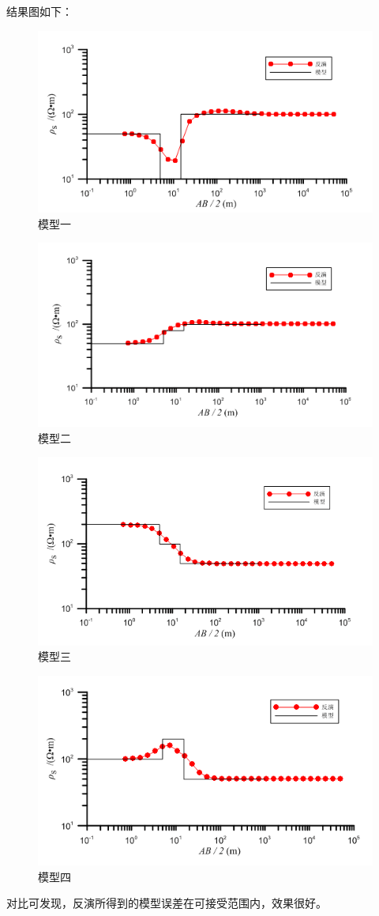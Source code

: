 \documentclass[hyperref,UTF-8,twoside]{ctexart}
\numberwithin{equation}{section}
\begin{document}
结果图如下：

\begin{figure}[ht]
\centering
\includegraphics[scale=0.5]{1.png}
\caption{模型一}
\end{figure}
\begin{figure}[ht]
\centering
\includegraphics[scale=0.5]{2.png}
\caption{模型二}
\end{figure}
\begin{figure}[ht]
\centering
\includegraphics[scale=0.5]{3.png}
\caption{模型三}
\end{figure}
\begin{figure}[ht]
\centering
\includegraphics[scale=0.5]{4.png}
\caption{模型四}
\end{figure}

对比可发现，反演所得到的模型误差在可接受范围内，效果很好。
\end{document}
